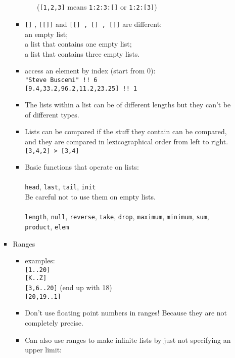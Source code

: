 \documentclass[a4paper,10pt]{article}
\begin{document}
\begin{enumerate}
\begin{enumerate}
\begin{itemize}
\begin{itemize}
\begin{itemize}
    \\\\(\texttt{[1,2,3]} means \texttt{1:2:3:[]} or \texttt{1:2:[3]})\\
   \end{itemize}
   \item \texttt{[]} , \texttt{[[]]} and \texttt{[[] , [] , []]} are different:
   \\an empty list;
   \\a list that contains one empty list;
   \\a list that contains three empty lists.
   \item access an element by index (start from 0):
   \\\texttt{"Steve Buscemi" !! 6}
   \\\texttt{[9.4,33.2,96.2,11.2,23.25] !! 1}
   \item The lists within a list can be of different lengths but they can't be of different types. 
   \item Lists can be compared if the stuff they contain can be compared, and they are compared in lexicographical order from left to right.
   \\\texttt{[3,4,2] > [3,4]}
   \item Basic functions that operate on lists:
   \\\\\texttt{head}, \texttt{last}, \texttt{tail}, \texttt{init}
   \\Be careful not to use them on empty lists. 
   \\\\\texttt{length}, \texttt{null}, \texttt{reverse}, \texttt{take}, \texttt{drop}, \texttt{maximum}, \texttt{minimum}, \texttt{sum}, \texttt{product}, \texttt{elem}\\
  \end{itemize}
  \item Ranges
  \begin{itemize}
   \item examples:
   \\\texttt{[1..20]}
   \\\texttt{[\textquotesingle K\textquotesingle ..\textquotesingle Z\textquotesingle ]}
   \\\texttt{[3,6..20]} (end up with 18)
   \\\texttt{[20,19..1]}
   \item Don't use floating point numbers in ranges! Because they are not completely precise.
   \item Can also use ranges to make infinite lists by just not specifying an upper limit:

\end{itemize}
\end{itemize}
\end{enumerate}
\end{enumerate}
\end{document}
